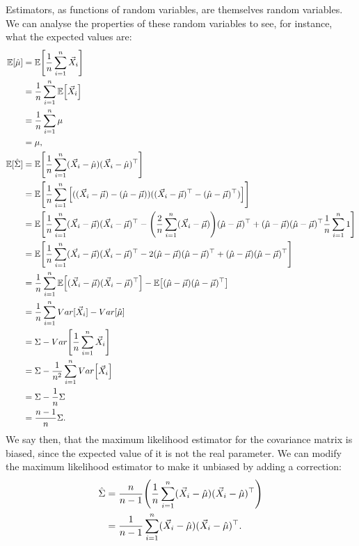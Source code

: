 \documentclass[headings=optiontoheadandtoc,listof=totoc,parskip=full]{scrartcl}
\begin{document}
Estimators, as functions of random variables, are themselves random variables. We can analyse the properties of these random variables to see, for instance, what the expected values are:
\begingroup
\allowdisplaybreaks
\begin{align*}
	\mathbb{E}[\hat \mu] &= \mathbb{E} \qty[\frac{1}{n} \sum_{i = 1}^n \vec X_i]\\
		&= \frac{1}{n}\sum_{i = 1}^n \mathbb{E} \qty[\vec X_i]\\
		&= \frac{1}{n}\sum_{i = 1}^n \mu\\
		&= \mu,\\
	\mathbb{E}[\hat \Sigma] &= \mathbb{E} \qty[\frac{1}{n} \sum_{i = 1}^n (\vec X_i - \hat \mu)(\vec X_i - \hat \mu)^\top]\\
		&= \mathbb{E} \qty[\frac{1}{n} \sum_{i = 1}^n \qty[((\vec X_i - \vec \mu) - (\hat \mu - \vec \mu))((\vec X_i - \vec \mu)^\top - (\hat \mu - \vec \mu)^\top)]]\\
		&= \mathbb{E} \qty[\frac{1}{n} \sum_{i = 1}^n(\vec X_i - \vec \mu)(\vec X_i - \vec \mu)^\top - \qty(\frac{2}{n} \sum_{i = 1}^n(\vec X_i - \vec \mu))(\hat \mu - \vec \mu)^\top + (\hat \mu - \vec \mu)(\hat \mu - \vec \mu)^\top \frac{1}{n} \sum_{i = 1}^n 1]\\
		&= \mathbb{E} \qty[\frac{1}{n} \sum_{i = 1}^n(\vec X_i - \vec \mu)(\vec X_i - \vec \mu)^\top - 2(\hat \mu - \vec \mu)(\hat \mu - \vec \mu)^\top + (\hat \mu - \vec \mu)(\hat \mu - \vec \mu)^\top]\\
		&= \frac{1}{n} \sum_{i = 1}^n\mathbb{E} \qty[(\vec X_i - \vec \mu)(\vec X_i - \vec \mu)^\top] - \mathbb{E} \qty[(\hat \mu - \vec \mu)(\hat \mu - \vec \mu)^\top]\\
		&= \frac{1}{n} \sum_{i = 1}^n Var[\vec X_i] - Var[\hat \mu]\\
		&= \Sigma - Var \qty[\frac{1}{n} \sum_{i = 1}^n \vec X_i]\\
		&= \Sigma - \frac{1}{n^2} \sum_{i = 1}^n Var \qty[\vec X_i]\\
		&= \Sigma - \frac{1}{n} \Sigma\\
		&= \frac{n - 1}{n} \Sigma.
\end{align*}
\endgroup
We say then, that the maximum likelihood estimator for the covariance matrix is biased, since the expected value of it is not the real parameter. We can modify the maximum likelihood estimator to make it unbiased by adding a correction:
\begin{equation}
	\begin{split}
		\hat \Sigma &= \frac{n}{n - 1} \qty(\frac{1}{n} \sum_{i = 1}^n (\vec X_i - \hat \mu)(\vec X_i - \hat \mu)^\top)\\
			&= \frac{1}{n - 1} \sum_{i = 1}^n (\vec X_i - \hat \mu)(\vec X_i - \hat \mu)^\top.
	\end{split}
\end{equation}
\end{document}
